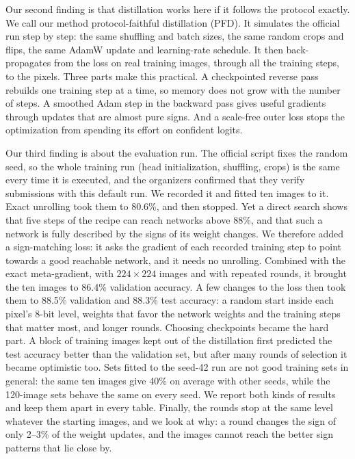 \documentclass[journal]{IEEEtran}
\begin{document}
Our second finding is that distillation works here if it follows the protocol exactly. We call our method
protocol-faithful distillation (PFD). It simulates the official run step by step: the same shuffling and batch
sizes, the same random crops and flips, the same AdamW update and learning-rate schedule. It then back-propagates
from the loss on real training images, through all the training steps, to the pixels. Three parts make this
practical. A checkpointed reverse pass rebuilds one training step at a time, so memory does not grow with the
number of steps. A smoothed Adam step in the backward pass gives useful gradients through updates that are almost
pure signs. And a scale-free outer loss stops the optimization from spending its effort on confident logits.

Our third finding is about the evaluation run. The official script fixes the random seed, so the whole training
run (head initialization, shuffling, crops) is the same every time it is executed, and the organizers confirmed that
they verify submissions with this default run. We recorded it and fitted ten images to it. Exact unrolling took
them to 80.6\%, and then stopped. Yet a direct search shows that five steps of the recipe can reach networks above
88\%, and that such a network is fully described by the signs of its weight changes. We therefore added a
sign-matching loss: it asks the gradient of each recorded training step to point towards a good reachable network,
and it needs no unrolling. Combined with the exact meta-gradient, with $224\times224$ images and with repeated
rounds, it brought the ten images to 86.4\% validation accuracy. A few changes to the loss then took them to 88.5\%
validation and 88.3\% test accuracy: a random start inside each pixel's 8-bit level, weights that favor the network
weights and the training steps that matter most, and longer rounds. Choosing checkpoints became the hard part. A
block of training images kept out of the distillation first predicted the test accuracy better than the validation
set, but after many rounds of selection it became optimistic too. Sets fitted to the seed-42 run are not good
training sets in general: the same ten images give 40\% on average with other seeds, while the 120-image sets
behave the same on every seed. We report both kinds of results and keep them apart in every table. Finally, the
rounds stop at the same level whatever the starting images, and we look at why: a round changes the sign of only
2--3\% of the weight updates, and the images cannot reach the better sign patterns that lie close by.
\end{document}
